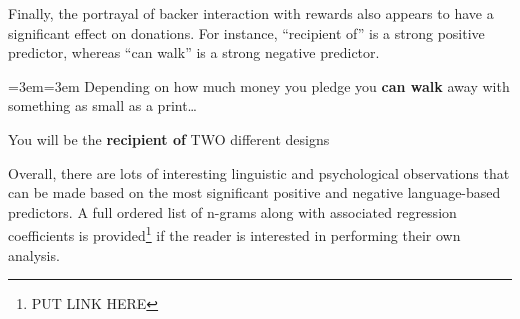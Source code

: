 \documentclass[letterpaper]{article}
\newenvironment{blockquote}{%
  \par%
  \setlength{\parskip}{.5em}
  \small
  \medskip
  \leftskip=3em\rightskip=3em%
  \noindent\ignorespaces}{%
  \par\medskip}
\begin{document}
Finally, the portrayal of backer interaction with rewards also appears to have a significant effect on donations. For instance, ``recipient of'' is a strong positive predictor, whereas ``can walk'' is a strong negative predictor.
\begin{blockquote}
Depending on how much money you pledge you \textbf{can walk} away with something as small as a print\ldots\par\noindent
You will be the \textbf{recipient of} TWO different designs
\end{blockquote}

Overall, there are lots of interesting linguistic and psychological observations that can be made based on the most significant positive and negative language-based predictors. A full ordered list of n-grams along with associated regression coefficients is provided\footnote{PUT LINK HERE} if the reader is interested in performing their own analysis.
\end{document}
